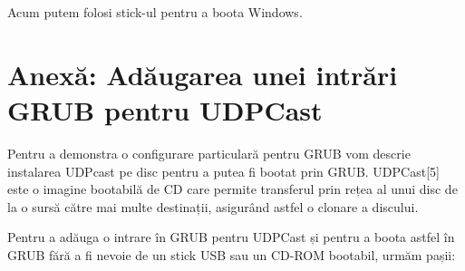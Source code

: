 Acum putem folosi stick-ul pentru a boota Windows.

\section{Anexă: Adăugarea unei intrări GRUB pentru UDPCast}
\label{sec:boot-grubconfig}

Pentru a demonstra o configurare particulară pentru GRUB vom descrie instalarea
UDPcast pe disc pentru a putea fi bootat prin GRUB. UDPCast[5] este o imagine
bootabilă de CD care permite transferul prin rețea al unui disc de la o sursă
către mai multe destinații, asigurând astfel o clonare a discului.

Pentru a adăuga o intrare în GRUB pentru UDPCast și pentru a boota astfel în
GRUB fără a fi nevoie de un stick USB sau un CD-ROM bootabil, urmăm pașii:


